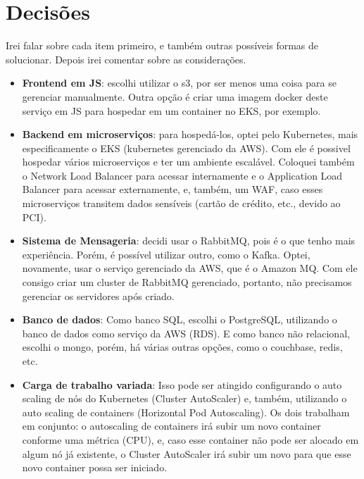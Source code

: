 \documentclass{article}
\begin{document}
    \section{Decisões}
        Irei falar sobre cada item primeiro, e também outras possíveis formas de solucionar.
        Depois irei comentar sobre as considerações.
        \begin{itemize}
            \item \textbf{Frontend em JS}: escolhi utilizar o s3, por ser menos uma coisa para se gerenciar manualmente. Outra opção é criar uma imagem docker deste serviço em JS para hospedar em um container no EKS, por exemplo.
            \item \textbf{Backend em microserviços}: para hospedá-los, optei pelo Kubernetes, mais especificamente o EKS (kubernetes gerenciado da AWS). Com ele é possivel hospedar vários microserviços e ter um ambiente escalável. Coloquei também o Network Load Balancer para acessar internamente e o Application Load Balancer para acessar externamente, e, também, um WAF, caso esses microserviços transitem dados sensíveis (cartão de crédito, etc., devido ao PCI).
            \item \textbf{Sistema de Mensageria}: decidi usar o RabbitMQ, pois é o que tenho mais experiência. Porém, é possível utilizar outro, como o Kafka. Optei, novamente, usar o serviço gerenciado da AWS, que é o Amazon MQ. Com ele consigo criar um cluster de RabbitMQ gerenciado, portanto, não precisamos gerenciar os servidores após criado.
            \item \textbf{Banco de dados}: Como banco SQL, escolhi o PostgreSQL, utilizando o banco de dados como serviço da AWS (RDS). E como banco não relacional, escolhi o mongo, porém, há várias outras opções, como o couchbase, redis, etc.
            \item \textbf{Carga de trabalho variada}: Isso pode ser atingido configurando o auto scaling de nós do Kubernetes (Cluster AutoScaler) e, também, utilizando o auto scaling de containers (Horizontal Pod Autoscaling). Os dois trabalham em conjunto: o autoscaling de containers irá subir um novo container conforme uma métrica (CPU), e, caso esse container não pode ser alocado em algum nó já existente, o Cluster AutoScaler irá subir um novo para que esse novo container possa ser iniciado.
        \end{itemize}
\end{document}
